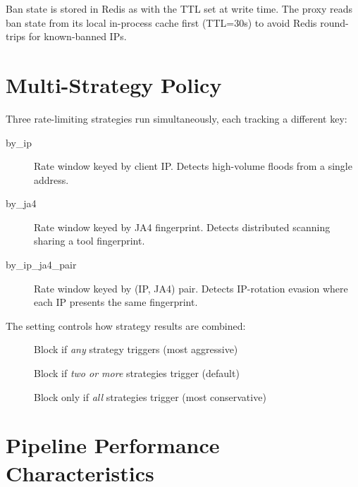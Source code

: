Ban state is stored in Redis as  with the TTL set at write time.
The proxy reads ban state from its local in-process cache first (TTL=30s) to avoid
Redis round-trips for known-banned IPs.

\section{Multi-Strategy Policy}

Three rate-limiting strategies run simultaneously, each tracking a different key:

\begin{description}
  \item[by\_ip] Rate window keyed by client IP. Detects high-volume floods from a single address.
  \item[by\_ja4] Rate window keyed by JA4 fingerprint. Detects distributed scanning sharing a tool fingerprint.
  \item[by\_ip\_ja4\_pair] Rate window keyed by (IP, JA4) pair. Detects IP-rotation evasion where each IP presents the same fingerprint.
\end{description}

The  setting controls how strategy results are combined:

\begin{description}
  \item[] Block if \emph{any} strategy triggers (most aggressive)
  \item[] Block if \emph{two or more} strategies trigger (default)
  \item[] Block only if \emph{all} strategies trigger (most conservative)
\end{description}

\section{Pipeline Performance Characteristics}

